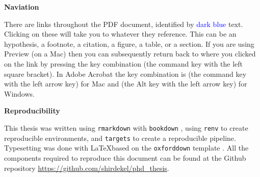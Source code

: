 \documentclass[a4paper, nobind, dvipsnames]{templates/ociamthesis}
\theoremstyle{definition}
\theoremstyle{definition}
\theoremstyle{definition}
\theoremstyle{definition}
\theoremstyle{remark}
\begin{document}
\begin{romanpages}

\maketitle



\begin{preface}
 	\textbf{Naviation}

  There are links throughout the PDF document, identified by \textcolor{Blue}{dark
  blue} text. Clicking on these will take you to whatever they reference. This can
  be an hypothesis, a footnote, a citation, a figure, a table, or a section. If
  you are using Preview (on a Mac) then you can subsequently return back to where
  you clicked on the link by pressing the key combination \keys{\cmd + [} (the
  command key with the left square bracket). In Adobe Acrobat the key combination
  is \keys{\cmd + \arrowkeyleft} (the command key with the left arrow key) for Mac
  and \keys{\Altwin + \arrowkeyleft} (the Alt key with the left arrow key) for
  Windows.

  \textbf{Reproducibility}

  This thesis was written using \texttt{rmarkdown} \autocite{xie2018} with \texttt{bookdown} \autocite{xie2016},
  using \texttt{renv} \autocite{ushey2021} to create reproducible environments, and \texttt{targets}
  \autocite{landau2021} to create a reproducible pipeline. Typesetting was done with
  \LaTeX based on the \texttt{oxforddown} template \autocite{lyngs2019}. All the components
  required to reproduce this document can be found at the Github repository
  \url{https://github.com/shirdekel/phd_thesis}.
\end{preface}


\end{romanpages}
\end{document}
